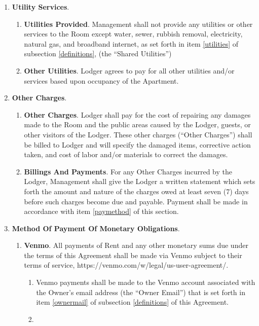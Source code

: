 \documentclass[12pt,letterpaper]{article}
\newcommand{\lodger}{Lodger}
\newcommand{\ownermail}{Owner Email}
\newcommand{\management}{Management}
\newcommand{\apt}{Apartment}
\newcommand{\room}{Room}
\newcommand{\utilities}{Shared Utilities}
\begin{document}
\begin{enumerate}
\begin{enumerate}
		\end{enumerate} 
	\item \textbf{Utility Services}. 
		\begin{enumerate} 
			\item \textbf{Utilities Provided}. \management{} shall not provide any utilities or other services to the \room{} except water, sewer, rubbish removal, electricity, natural gas, and broadband internet, as set forth in item \ref{utilities} of subsection \ref{definitions}, (the ``\utilities{}'')
			\item \textbf{Other Utilities}. \lodger{} agrees to pay for all other utilities and/or services based upon occupancy of the \apt{}.
		\end{enumerate} 
	\item \textbf{Other Charges}. 
		\begin{enumerate} 
			\item \textbf{Other Charges}. \lodger{} shall pay for the cost of repairing any damages made to the \room{} and the public areas caused by the \lodger{}, guests, or other visitors of the \lodger{}. These other charges (``Other Charges'') shall be billed to \lodger{} and will specify the damaged items, corrective action taken, and cost of labor and/or materials to correct the damages. 
			\item \textbf{Billings And Payments}. For any Other Charges incurred by the \lodger{}, \management{} shall give the \lodger{} a written statement which sets forth the amount and nature of the charges owed at least seven (7) days before such charges become due and payable. Payment shall be made in accordance with item \ref{paymethod} of this section. 
		\end{enumerate} 
	\item \textbf{Method Of Payment Of Monetary Obligations}. \label{paymethod}
		\begin{enumerate} 
			\item \textbf{Venmo}. All payments of Rent and any other monetary sums due under the terms of this Agreement shall be made via Venmo subject to their terms of service, https://venmo.com/w/legal/us-user-agreement/. 
				\begin{enumerate}
					\item Venmo payments shall be made to the Venmo account associated with the Owner's email address (the ``\ownermail{}'') that is set forth in item \ref{ownermail} of subsection \ref{definitions} of this Agreement{}. 
					\item \label{defpaytime} 

\end{enumerate}
\end{enumerate}
\end{enumerate}
\end{document}
